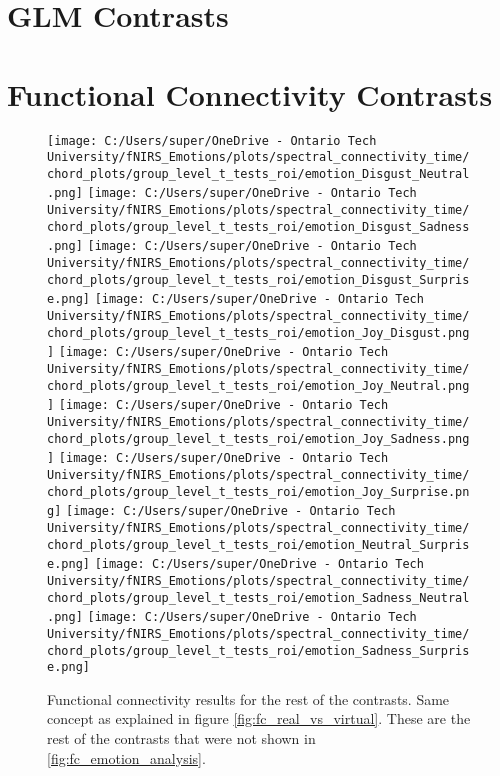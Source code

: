 \chapter{GLM Contrasts}
\label{tab:appendix_glm_results}


\chapter{Functional Connectivity Contrasts}
\begin{figure}[H]
    \centering
    \texttt{[image: C:/Users/super/OneDrive - Ontario Tech University/fNIRS\_Emotions/plots/spectral\_connectivity\_time/chord\_plots/group\_level\_t\_tests\_roi/emotion\_Disgust\_Neutral.png]}
    \texttt{[image: C:/Users/super/OneDrive - Ontario Tech University/fNIRS\_Emotions/plots/spectral\_connectivity\_time/chord\_plots/group\_level\_t\_tests\_roi/emotion\_Disgust\_Sadness.png]}
    \texttt{[image: C:/Users/super/OneDrive - Ontario Tech University/fNIRS\_Emotions/plots/spectral\_connectivity\_time/chord\_plots/group\_level\_t\_tests\_roi/emotion\_Disgust\_Surprise.png]}
    \texttt{[image: C:/Users/super/OneDrive - Ontario Tech University/fNIRS\_Emotions/plots/spectral\_connectivity\_time/chord\_plots/group\_level\_t\_tests\_roi/emotion\_Joy\_Disgust.png]}
    \texttt{[image: C:/Users/super/OneDrive - Ontario Tech University/fNIRS\_Emotions/plots/spectral\_connectivity\_time/chord\_plots/group\_level\_t\_tests\_roi/emotion\_Joy\_Neutral.png]}
    \texttt{[image: C:/Users/super/OneDrive - Ontario Tech University/fNIRS\_Emotions/plots/spectral\_connectivity\_time/chord\_plots/group\_level\_t\_tests\_roi/emotion\_Joy\_Sadness.png]}
    \texttt{[image: C:/Users/super/OneDrive - Ontario Tech University/fNIRS\_Emotions/plots/spectral\_connectivity\_time/chord\_plots/group\_level\_t\_tests\_roi/emotion\_Joy\_Surprise.png]}
    \texttt{[image: C:/Users/super/OneDrive - Ontario Tech University/fNIRS\_Emotions/plots/spectral\_connectivity\_time/chord\_plots/group\_level\_t\_tests\_roi/emotion\_Neutral\_Surprise.png]}
    \texttt{[image: C:/Users/super/OneDrive - Ontario Tech University/fNIRS\_Emotions/plots/spectral\_connectivity\_time/chord\_plots/group\_level\_t\_tests\_roi/emotion\_Sadness\_Neutral.png]}
    \texttt{[image: C:/Users/super/OneDrive - Ontario Tech University/fNIRS\_Emotions/plots/spectral\_connectivity\_time/chord\_plots/group\_level\_t\_tests\_roi/emotion\_Sadness\_Surprise.png]}
    \caption[FC: Additional emotion contrasts]{Functional connectivity results for the rest of the contrasts.
    Same concept as explained in figure \ref{fig:fc_real_vs_virtual}. 
    These are the rest of the contrasts that were not shown in \ref{fig:fc_emotion_analysis}. }
    \label{fig:appendix_fc_emotion_analysis}
\end{figure}

